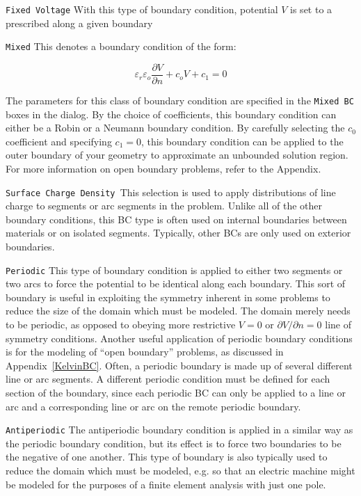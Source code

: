 \documentclass[12pt]{report}
\begin{document}
\texttt{Fixed Voltage} With this type of boundary condition, potential $V$ is
set to a prescribed along a given boundary

\texttt{Mixed} This denotes a boundary condition of the form:

\begin{equation}
\label{eq7}
\varepsilon _r \varepsilon _o \frac{\partial V}{\partial n} + c_o V + c_1 =
0
\end{equation}

The parameters for this class of boundary condition are specified in the
\texttt{Mixed BC} boxes in the dialog. By the choice of
coefficients, this boundary condition can either be a Robin or a Neumann
boundary condition. By carefully selecting the $c_0 $ coefficient and
specifying $c_1 = 0$, this boundary condition can be applied to the outer
boundary of your geometry to approximate an unbounded solution region. For
more information on open boundary problems, refer to the Appendix.

\texttt{Surface Charge Density }This selection is used to apply
distributions of line charge to segments or arc segments in the problem.
Unlike all of the other boundary conditions, this BC type is often used on
internal boundaries between materials or on isolated segments. Typically,
other BCs are only used on exterior boundaries.

\texttt{Periodic} This type of boundary condition is applied to either two
segments or two arcs to force the potential to be identical along each
boundary. This sort of boundary is useful in exploiting the symmetry
inherent in some problems to reduce the size of the domain which must be
modeled. The domain merely needs to be periodic, as opposed to obeying more
restrictive $V = 0$ or $\partial V / \partial n = 0$ line of symmetry
conditions. Another useful application of periodic boundary conditions is
for the modeling of ``open boundary'' problems, as discussed in
Appendix~\ref{KelvinBC}.
Often, a periodic boundary is made up of several different line or arc
segments. A different periodic condition must be defined for each section of
the boundary, since each periodic BC can only be applied to a line or arc
and a corresponding line or arc on the remote periodic boundary.

\texttt{Antiperiodic} The antiperiodic boundary condition is
applied in a similar way as the periodic boundary condition, but
its effect is to force two boundaries to be the negative of one
another. This type of boundary is also typically used to reduce the
domain which must be modeled, e.g. so that an electric machine
might be modeled for the purposes of a finite element analysis with
just one pole.
\end{document}
